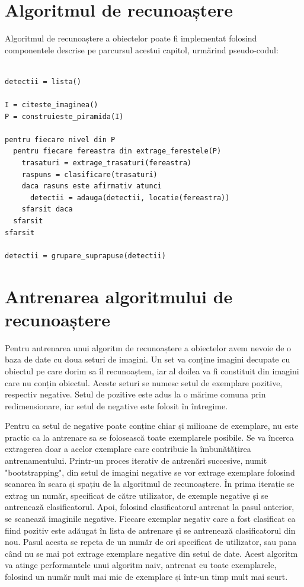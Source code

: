\pagebreak
\section{Algoritmul de recunoaștere}

Algoritmul de recunoaștere a obiectelor poate fi implementat folosind componentele descrise pe parcursul acestui capitol, urmărind pseudo-codul:
\begin{mdframed}
\begin{verbatim}

detectii = lista()

I = citeste_imaginea()
P = construieste_piramida(I)

pentru fiecare nivel din P
  pentru fiecare fereastra din extrage_ferestele(P)
    trasaturi = extrage_trasaturi(fereastra)
    raspuns = clasificare(trasaturi)
    daca rasuns este afirmativ atunci
      detectii = adauga(detectii, locatie(fereastra))
    sfarsit daca
  sfarsit
sfarsit

detectii = grupare_suprapuse(detectii)

\end{verbatim}
\end{mdframed}

\section{Antrenarea algoritmului de recunoaștere}

Pentru antrenarea unui algoritm de recunoaștere a obiectelor avem nevoie de o baza de date cu doua seturi de imagini.
Un set va conține imagini decupate cu obiectul pe care dorim sa îl recunoaștem, iar al doilea va fi constituit din imagini care nu conțin obiectul.
Aceste seturi se numesc setul de exemplare pozitive, respectiv negative.
Setul de pozitive este adus la o mărime comuna prin redimensionare, iar setul de negative este folosit în întregime.

Pentru ca setul de negative poate conține chiar și milioane de exemplare, nu este practic ca la antrenare sa se folosească toate exemplarele posibile.
Se va încerca extragerea doar a acelor exemplare care contribuie la îmbunătățirea antrenamentului.
Printr-un proces iterativ de antrenări succesive, numit "bootstrapping", din setul de imagini negative se vor extrage exemplare folosind scanarea în scara și spațiu de la algoritmul de recunoaștere.
În prima iterație se extrag un număr, specificat de către utilizator, de exemple negative și se antrenează clasificatorul.
Apoi, folosind clasificatorul antrenat la pasul anterior, se scanează imaginile negative.
Fiecare exemplar negativ care a fost clasificat ca fiind pozitiv este adăugat în lista de antrenare și se antrenează clasificatorul din nou.
Pasul acesta se repeta de un număr de ori specificat de utilizator, sau pana când nu se mai pot extrage exemplare negative din setul de date.
Acest algoritm va atinge performantele unui algoritm naiv, antrenat cu toate exemplarele, folosind un număr mult mai mic de exemplare și într-un timp mult mai scurt.

